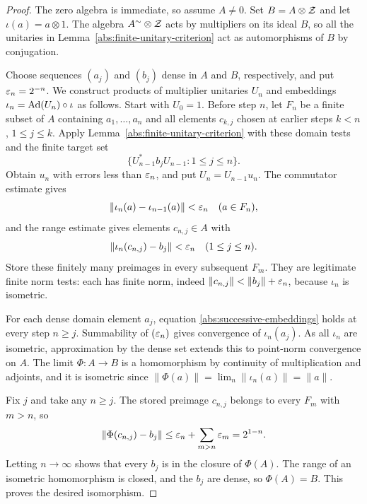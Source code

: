 \begin{proof}
The zero algebra is immediate, so assume $A\ne0$.
Set $B=A\otimes\mathcal Z$ and let $\iota(a)=a\otimes1$.
The algebra $A^{\sim}\otimes\mathcal Z$ acts by multipliers on its ideal
$B$, so all the unitaries in Lemma~\ref{abs:finite-unitary-criterion}
act as automorphisms of $B$ by conjugation.

Choose sequences $(a_j)$ and $(b_j)$ dense in $A$ and $B$,
respectively, and put $\varepsilon_n=2^{-n}$.
We construct products of multiplier unitaries $U_n$ and embeddings
$\iota_n=\operatorname{Ad}(U_n)\circ\iota$ as follows.  Start with $U_0=1$.
Before step $n$, let $F_n$ be a finite subset of $A$ containing
$a_1,\ldots,a_n$ and all elements $c_{k,j}$ chosen at earlier
steps $k<n$, $1\le j\le k$.  Apply
Lemma~\ref{abs:finite-unitary-criterion} with these domain tests and
the finite target set
\[
 \{U_{n-1}^*b_jU_{n-1}:1\le j\le n\}.
\]
Obtain $u_n$ with errors less than $\varepsilon_n$, and put
$U_n=U_{n-1}u_n$.
The commutator estimate gives
\begin{equation}\label{abs:successive-embeddings}
 \|\iota_n(a)-\iota_{n-1}(a)\|<\varepsilon_n
 \quad(a\in F_n),
\end{equation}
and the range estimate gives elements $c_{n,j}\in A$ with
\begin{equation}\label{abs:stored-preimages}
 \|\iota_n(c_{n,j})-b_j\|<\varepsilon_n
 \quad(1\le j\le n).
\end{equation}
Store these finitely many preimages in every subsequent $F_m$.
They are legitimate finite norm tests: each has finite norm, indeed
$\|c_{n,j}\|<\|b_j\|+\varepsilon_n$, because $\iota_n$ is isometric.

For each dense domain element $a_j$, equation
\eqref{abs:successive-embeddings} holds at every step $n\ge j$.
Summability of $(\varepsilon_n)$ gives convergence of $\iota_n(a_j)$.
As all $\iota_n$ are isometric, approximation by the dense set
extends this to point-norm convergence on $A$.
The limit $\Phi:A\to B$ is a homomorphism by continuity of
multiplication and adjoints, and it is isometric since
$\|\Phi(a)\|=\lim_n\|\iota_n(a)\|=\|a\|$.

Fix $j$ and take any $n\ge j$.  The stored preimage $c_{n,j}$
belongs to every $F_m$ with $m>n$, so
\[
 \|\Phi(c_{n,j})-b_j\|
 \le\varepsilon_n+\sum_{m>n}\varepsilon_m=2^{1-n}.
\]
Letting $n\to\infty$ shows that every $b_j$ is in the closure
of $\Phi(A)$.  The range of an isometric homomorphism is closed,
and the $b_j$ are dense, so $\Phi(A)=B$.  This proves the desired
isomorphism.


\end{proof}
